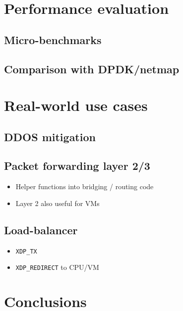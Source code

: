 \documentclass[10pt]{sig-alternate-05-2015}
\begin{document}
\section{Performance evaluation}
\label{sec:perf-eval}
\subsection{Micro-benchmarks}
\label{sec:org72788e2}
\subsection{Comparison with DPDK/netmap}
\label{sec:org7f03063}
\section{Real-world use cases}
\label{sec:org60dd487}
\subsection{DDOS mitigation}
\label{sec:org5f83e1d}
\subsection{Packet forwarding layer 2/3}
\label{sec:org3681460}
\begin{itemize}
\item Helper functions into bridging / routing code
\item Layer 2 also useful for VMs
\end{itemize}
\subsection{Load-balancer}
\label{sec:org685e28c}
\begin{itemize}
\item \texttt{XDP\_TX}
\item \texttt{XDP\_REDIRECT} to CPU/VM
\end{itemize}
\section{Conclusions}
\label{sec:conclusion}







\end{document}
